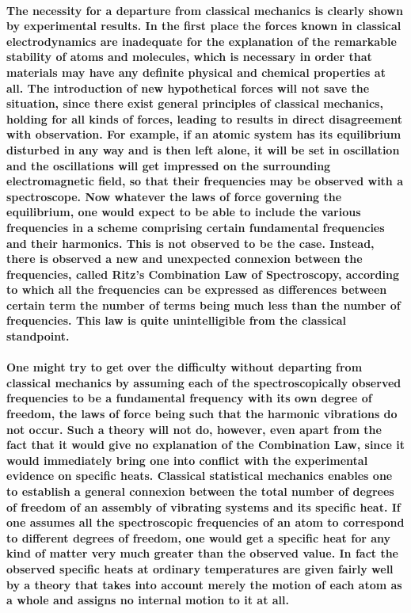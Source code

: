 \documentclass[10pt, kindle, oneside]{kindle}
\begin{document}
\paragraph{The necessity for a departure from classical mechanics is clearly shown by experimental results. In the first place the forces known in classical electrodynamics are inadequate for the explanation of the remarkable stability of atoms and molecules, which is necessary in order that materials may have any definite physical and chemical properties at all. The introduction of new hypothetical forces will not save the situation, since there exist general principles of classical mechanics, holding for all kinds of forces, leading to results in direct disagreement with observation. For example, if an atomic system has its equilibrium disturbed in any way and is then left alone, it will be set in oscillation and the oscillations will get impressed on the surrounding electromagnetic field, so that their frequencies may be observed with a spectroscope. Now whatever the laws of force governing the equilibrium, one would expect to be able to include the various frequencies in a scheme comprising certain fundamental frequencies and their harmonics. This is not observed to be the case. Instead, there is observed a new and unexpected connexion between the frequencies, called Ritz's Combination Law of Spectroscopy, according to which all the frequencies can be expressed as differences between certain term the number of terms being much less than the number of frequencies. This law is quite unintelligible from the classical standpoint.}
\paragraph{One might try to get over the difficulty without departing from classical mechanics by assuming each of the spectroscopically observed frequencies to be a fundamental frequency with its own degree of freedom, the laws of force being such that the harmonic vibrations do not occur. Such a theory will not do, however, even apart from the fact that it would give no explanation of the Combination Law, since it would immediately bring one into conflict with the experimental evidence on specific heats. Classical statistical mechanics enables one to establish a general connexion between the total number of degrees of freedom of an assembly of vibrating systems and its specific heat. If one assumes all the spectroscopic frequencies of an atom to correspond to different degrees of freedom, one would get a specific heat for any kind of matter very much greater than the observed value. In fact the observed specific heats at ordinary temperatures are given fairly well by a theory that takes into account merely the motion of each atom as a whole and assigns no internal motion to it at all.}
\end{document}

